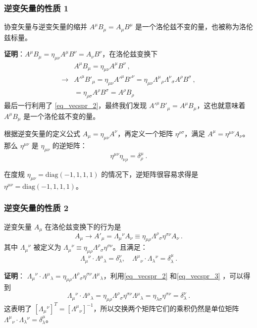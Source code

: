 \subsubsection{逆变矢量的性质 1}
\begin{lemma}{}
协变矢量与逆变矢量的缩并 $A^\mu B_\mu=A_\mu B^\mu$ 是一个洛伦兹不变的量，也被称为洛伦兹标量。
\end{lemma}
\textbf{证明}：$A^\mu B_\mu = \eta_{\mu\nu}A^\mu B^\nu=A_\nu B^\nu$，在洛伦兹变换下 \begin{equation}
\begin{aligned}
&A^\mu B_\mu = \eta_{\mu\nu}A^\mu B^\nu ~,\\
\rightarrow &{A'}^\mu {B'}_\mu =\eta_{\mu\nu}{A'}^\mu {B'}^\nu = \eta_{\mu\nu}\Lambda^{\mu}{}_\rho\Lambda^\nu{}_\sigma A^\rho  B^\sigma~,\\
&=\eta_{\rho\sigma}A^\rho B^\sigma = A^\rho B_\rho
\end{aligned}
\end{equation}
最后一行利用了 \autoref{eq_vecspr_2}，最终我们发现 ${A'}^\mu {B'}_\mu = A^\mu B_\mu $，这也就意味着 $A^\mu B_\mu$ 是一个洛伦兹不变的量。
\begin{lemma}{}
根据逆变矢量的定义公式 $A_\mu = \eta_{\mu\nu}A^\nu$，再定义一个矩阵 $\eta^{\rho\sigma}$，满足 $A^\mu = \eta^{\mu\nu} A_\nu$。那么 $\eta^{\mu\nu}$ 是 $\eta_{\mu\nu}$ 的逆矩阵：
\begin{equation}\label{eq_vecspr_3}
\eta^{\mu\nu}\eta_{\nu\rho}=\delta^{\mu}_\rho~.
\end{equation}
\end{lemma}
在度规 $\eta_{\mu\nu} = \mathrm{diag}(-1,1,1,1)$ 的情况下，逆矩阵很容易求得是 $\eta^{\mu\nu} = \mathrm{diag}(-1,1,1,1)$。
\subsubsection{逆变矢量的性质 2}
\begin{lemma}{}
逆变矢量 $A_\mu$ 在洛伦兹变换下的行为是
\begin{equation}
A_\mu \rightarrow  A'_\mu = \Lambda_{\mu}{}^\nu A_\nu\equiv\eta_{\mu\rho}\Lambda^{\rho}{}_\sigma \eta^{\sigma\nu} A_\nu~.
\end{equation}
其中 $\Lambda_{\mu}{}^\nu$ 被定义为 $\Lambda_\mu{}^\nu \equiv \eta_{\mu\rho}\Lambda^{\rho}{}_\sigma \eta^{\sigma\nu} $。且满足：
\begin{equation}
\Lambda_\mu{}^\nu \cdot \Lambda{}^\mu{}_\lambda = \delta^\nu_\lambda,\quad \Lambda^\mu{}_\nu\cdot \Lambda_\lambda{}^\nu =\delta^\mu_\lambda
~.
\end{equation}
\end{lemma}
\textbf{证明}： $\Lambda_\mu{}^\nu \cdot \Lambda{}^\mu{}_\lambda =\eta_{\mu\rho}\Lambda^{\rho}{}_\sigma \eta^{\sigma\nu} \Lambda{}^\mu{}_\lambda $，利用\autoref{eq_vecspr_2} 和\autoref{eq_vecspr_3} ，可以得到
\begin{equation}
\Lambda_\mu{}^\nu \cdot \Lambda{}^\mu{}_\lambda =\eta_{\mu\rho}\Lambda^{\rho}{}_\sigma \eta^{\sigma\nu} \Lambda{}^\mu{}_\lambda=\eta_{\lambda\sigma} \eta^{\sigma\nu}= \delta_\lambda^\nu~.
\end{equation}
这表明了 $[\Lambda_\mu{}^\nu]^T = [\Lambda^\mu{}_\nu]^{-1}$，所以交换两个矩阵它们的乘积仍然是单位矩阵 $\Lambda^\mu{}_\nu \cdot \Lambda_\lambda{}^\nu = \delta_\lambda^\mu$。